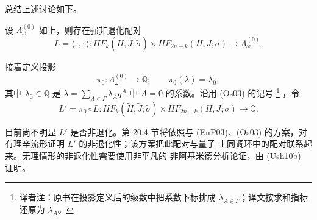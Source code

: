 总结上述讨论如下。

\begin{theorem}
\label{thm:strongly-nondegenerate-floer-pairing}
设 $\Lambda_\omega^{(0)}$ 如上，则存在强非退化配对
\begin{equation}
 L=\langle\,\cdot,\cdot\,\rangle:
 HF_k(\widetilde H,\widetilde J;\widetilde\sigma)
 \times HF_{2n-k}(H,J;\sigma)
 \longrightarrow\Lambda_\omega^{(0)}.
\label{eq:19-strong-floer-pairing}
\end{equation}
\end{theorem}

接着定义投影
\begin{equation}
 \pi_0:\Lambda_\omega^{(0)}\longrightarrow\mathbb Q;\qquad
 \pi_0(\lambda)=\lambda_0,
\label{eq:19-zero-novikov-coefficient-projection}
\end{equation}
其中 $\lambda_0\in\mathbb Q$ 是
$\lambda=\sum_{A\in\Gamma}\lambda_Aq^A$ 中 $A=0$ 的系数。沿用 (Os03) 的记号
\footnote{译者注：原书在投影定义后的级数中把系数下标排成
$\lambda_{A\in\Gamma}$；译文按求和指标还原为 $\lambda_A$。}
，令
\begin{equation}
 L'=\pi_0\circ L:
 HF_k(\widetilde H,\widetilde J;\widetilde\sigma)
 \times HF_{2n-k}(H,J;\sigma)\longrightarrow\mathbb Q.
\label{eq:19-rational-floer-pairing}
\end{equation}

目前尚不明显 $L'$ 是否非退化。第 20.4 节将依照\personEntov{}与\personPolterovich{}
(EnP03)、(Os03) 的方案，对有理辛流形证明 $L'$ 的非退化性；该方案把此配对与量子
上同调环中的\personFrobenius{}配对联系起来。无理情形的非退化性需要使用非平凡的
非阿基米德分析论证，由\personUsher{} (Ush10b) 证明。
